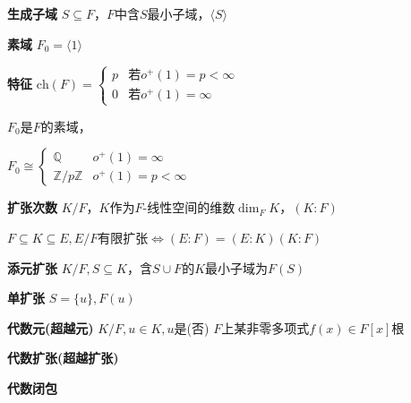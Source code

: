 \documentclass[a4paper,10pt]{ctexart}
\newcommand*{\setZ}{\mathbb{Z}}
\newcommand*{\setQ}{\mathbb{Q}}
\renewcommand*{\iff}{\Leftrightarrow}
\newcommand*{\genfield}[1]{\langle #1 \rangle}
\newcommand{\ch}[1]{\text{ch}(#1)}
\newcommand{\set}[1]{\{#1\}}
\begin{document}
\begin{multicols}{3}
    \textbf{生成子域} $S \subseteq F$，$F$中含$S$最小子域，$\genfield{S}$

    \textbf{素域} $F_0 = \genfield{1}$

    \textbf{特征} $\ch{F} = \begin{cases}
            p & \text{若}o^+(1) = p < \infty \\
            0 & \text{若}o^+(1) = \infty
        \end{cases}$

    \begin{theorem}[素域同构]
        $F_0$是$F$的素域，

        $F_0 \cong \begin{cases}
                \setQ        & o^+(1) = \infty     \\
                \setZ/p\setZ & o^+(1) = p < \infty
            \end{cases}$
    \end{theorem}

    \textbf{扩张次数} $K/F$，$K$作为$F$-线性空间的维数$\dim_F K$，$(K:F)$

    \begin{theorem}[链式法则]
        $F\subseteq K \subseteq E, E/F$有限扩张$\iff (E:F)=(E:K)(K:F)$
    \end{theorem}

    \textbf{添元扩张} $K/F, S\subseteq K$，含$S\cup F$的$K$最小子域为$F(S)$

    \textbf{单扩张} $S = \set{u}, F(u)$

    \textbf{代数元(超越元)} $K/F, u\in K, u$是(否) $F$上某非零多项式$f(x)\in F[x]$根

    \begin{theorem}[单扩张定理]

    \end{theorem}

    \textbf{代数扩张(超越扩张)}

    \textbf{代数闭包}

\end{multicols}
\end{document}
